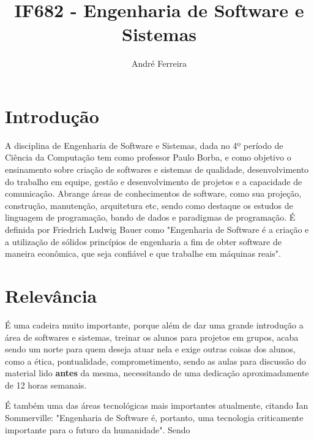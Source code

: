 \documentclass[a4paper]{article}
\title{IF682 - Engenharia de Software e Sistemas}
\author{André Ferreira}
\begin{document}
\maketitle
\section{Introdução}
A disciplina de Engenharia de Software e Sistemas, dada no 4º período de Ciência da Computação tem como professor Paulo Borba, e como objetivo o ensinamento sobre criação de softwares e sistemas de qualidade, desenvolvimento do trabalho em equipe, gestão e desenvolvimento de projetos e a capacidade de comunicação. Abrange áreas de conhecimentos de software, como sua projeção, construção, manutenção, arquitetura etc, sendo como destaque os estudos de linguagem de programação, bando de dados e paradigmas de programação. É definida por Friedrich Ludwig Bauer como "Engenharia de Software é a criação e a utilização de sólidos princípios de engenharia a fim de obter software de maneira econômica, que seja confiável e que trabalhe em máquinas reais".

\section{Relevância}
 É uma cadeira muito importante, porque além de dar uma grande introdução a área de softwares e sistemas, treinar os alunos para projetos em grupos, acaba sendo um norte para quem deseja atuar nela e exige outras coisas dos alunos, como a ética, pontualidade, comprometimento, sendo as aulas para discussão do material lido \textbf{antes} da mesma, necessitando de uma dedicação aproximadamente de 12 horas semanais\cite{slides}.

É também uma das áreas tecnológicas mais importantes atualmente, citando Ian Sommerville: "Engenharia de Software é, portanto, uma tecnologia criticamente importante para o futuro da humanidade"\cite{Ian}. Sendo 
\end{document}
